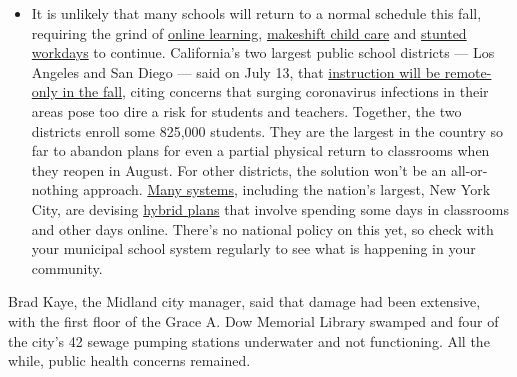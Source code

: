 \begin{itemize}
  \begin{itemize}
  \tightlist
  \item
    It is unlikely that many schools will return to a normal schedule
    this fall, requiring the grind of
    \href{https://www.nytimes3xbfgragh.onion/2020/06/05/us/coronavirus-education-lost-learning.html?action=click\&pgtype=Article\&state=default\&region=MAIN_CONTENT_3\&context=storylines_faq}{online
    learning},
    \href{https://www.nytimes3xbfgragh.onion/2020/05/29/us/coronavirus-child-care-centers.html?action=click\&pgtype=Article\&state=default\&region=MAIN_CONTENT_3\&context=storylines_faq}{makeshift
    child care} and
    \href{https://www.nytimes3xbfgragh.onion/2020/06/03/business/economy/coronavirus-working-women.html?action=click\&pgtype=Article\&state=default\&region=MAIN_CONTENT_3\&context=storylines_faq}{stunted
    workdays} to continue. California's two largest public school
    districts --- Los Angeles and San Diego --- said on July 13, that
    \href{https://www.nytimes3xbfgragh.onion/2020/07/13/us/lausd-san-diego-school-reopening.html?action=click\&pgtype=Article\&state=default\&region=MAIN_CONTENT_3\&context=storylines_faq}{instruction
    will be remote-only in the fall}, citing concerns that surging
    coronavirus infections in their areas pose too dire a risk for
    students and teachers. Together, the two districts enroll some
    825,000 students. They are the largest in the country so far to
    abandon plans for even a partial physical return to classrooms when
    they reopen in August. For other districts, the solution won't be an
    all-or-nothing approach.
    \href{https://bioethics.jhu.edu/research-and-outreach/projects/eschool-initiative/school-policy-tracker/}{Many
    systems}, including the nation's largest, New York City, are
    devising
    \href{https://www.nytimes3xbfgragh.onion/2020/06/26/us/coronavirus-schools-reopen-fall.html?action=click\&pgtype=Article\&state=default\&region=MAIN_CONTENT_3\&context=storylines_faq}{hybrid
    plans} that involve spending some days in classrooms and other days
    online. There's no national policy on this yet, so check with your
    municipal school system regularly to see what is happening in your
    community.
  \end{itemize}
\end{itemize}

Brad Kaye, the Midland city manager, said that damage had been
extensive, with the first floor of the Grace A. Dow Memorial Library
swamped and four of the city's 42 sewage pumping stations underwater and
not functioning. All the while, public health concerns remained.

